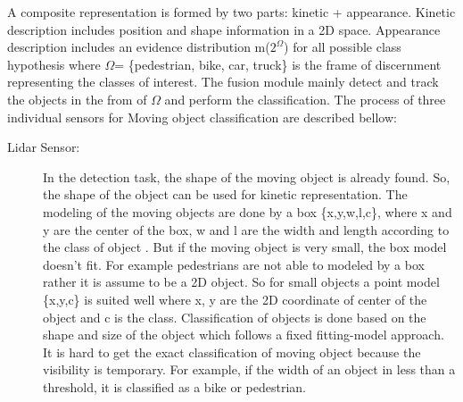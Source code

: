 A composite representation is formed by two parts: kinetic + appearance\cite{Chavez_Garcia_2016}. Kinetic description includes position and shape information in a 2D space. Appearance description includes an evidence distribution m($2^{\Omega}$) for all possible class hypothesis where $\Omega$= \{pedestrian, bike, car, truck\} is the frame of discernment representing the classes of interest\cite{Chavez_Garcia_2016}. The fusion module mainly detect and track the objects in the from of $\Omega$ and perform the classification. The process of three individual sensors for Moving object classification are described bellow:
\begin{description}
    \item[Lidar Sensor:] In the detection task, the shape of the moving object is already found. So, the shape of the object can be used for kinetic representation. The modeling of the moving objects are done by a box \{x,y,w,l,c\}, where x and y are the center of the box, w and l are the width and length according to the class of object \cite{Chavez_Garcia_2016}. But if the moving object is very small, the box model doesn't fit. For example pedestrians are not able to modeled by a box rather it is assume to be a 2D object. So for small objects a point model \{x,y,c\} is suited well where x, y are the 2D coordinate of center of the object and c is the class. Classification of objects is done based on the shape and size of the object which follows a fixed fitting-model approach. It is hard to get the exact classification of moving object because the visibility is temporary. For example, if the width of an object in less than a threshold, it is classified as a bike or pedestrian.
    

\end{description}
